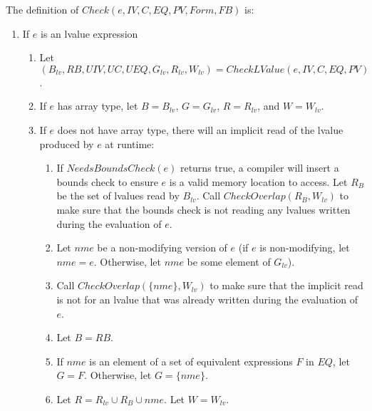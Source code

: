 The definition of $Check(e, IV, C, EQ, PV, Form, FB)$ is:
\begin{enumerate}
\item If $e$ is an lvalue expression
\begin{enumerate}
\item Let $(B_{lv}, RB, \mathit{UIV}, \mathit{UC}, UEQ, G_{lv}, R_{lv}, W_{lv}) = 
         CheckLValue(e, IV, C, EQ, PV)$.
\item If $e$ has array type, let $B = B_{lv}$, $G = G_{lv}$, $R = R_{lv}$, and $W = W_{lv}$.
\item If $e$ does not have array type, there will an implicit read of the lvalue produced by $e$
at runtime:
\begin{enumerate}
\item If $NeedsBoundsCheck(e)$ returns true, a compiler will insert a bounds check 
to ensure $e$ is a valid memory location to access. Let $R_B$ be the set of lvalues read by $B_{lv}$.
Call $CheckOverlap(R_B, W_{lv})$ to make sure that the bounds check is not reading any lvalues
written during the evaluation of $e$.
\item Let $nme$ be a non-modifying version of $e$ (if $e$ is non-modifying, let $nme = e$.  Otherwise, let $nme$ be some element of $G_{lv}$).
\item Call $CheckOverlap(\{nme\}, W_{lv})$ to make sure that the implicit read is not for
an lvalue that was already written during the evaluation of $e$.
\item Let $B = RB$. 
\item If $nme$ is an element of a set of equivalent expressions $F$ in $EQ$, 
let $G = F$.  Otherwise, let $G = \{ nme \}$. 
\item Let $R = R_{lv} \cup R_B \cup nme$.  Let $W = W_{lv}$.
\end{enumerate}
\end{enumerate}



\end{enumerate}
